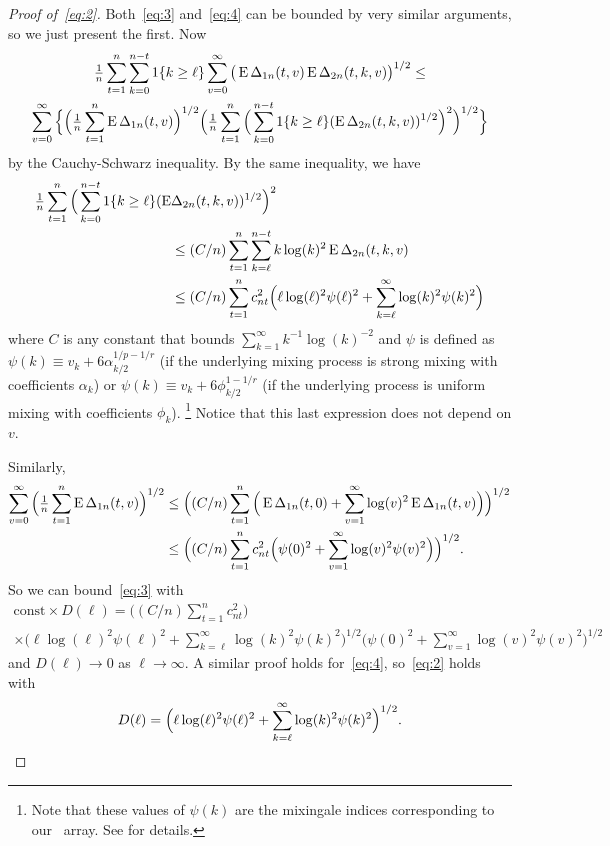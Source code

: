 \documentclass[11pt]{article}
\begin{document}
{\begin{proof}[Proof of~\eqref{eq:2}]
  Both~\eqref{eq:3} and~\eqref{eq:4} can be bounded by very similar
  arguments, so we just present the first. Now
  \begin{multline*}
    \tfrac{1}{n} \sum_{t=1}^n \sum_{k=0}^{n-t}  1\{k \geq \ell\}
    \sum_{v=0}^\infty \big(\operatorname{E} \Delta_{1n}(t,v) \operatorname{E} \Delta_{2n}(t,k,v)\big)^{1/2} \leq \\
    \sum_{v=0}^\infty \Big\{
    \Big(\tfrac{1}{n} \sum_{t=1}^n \operatorname{E} \Delta_{1n}(t, v) \Big)^{1/2}
    \Big(\tfrac{1}{n} \sum_{t=1}^n \Big(\sum_{k=0}^{n-t}
    1\{k \geq \ell\} (\operatorname{E} \Delta_{2n}(t,k,v))^{1/2} \Big)^2 \Big)^{1/2}
    \Big\}
  \end{multline*}
  by the Cauchy-Schwarz inequality.  By the same inequality, we have
  \begin{align*}
    \tfrac{1}{n} \sum_{t=1}^n \Big(\sum_{k=0}^{n-t}
    1\{k \geq \ell\} (\operatorname{E} & \Delta_{2n}(t,k,v))^{1/2} \Big)^2 \\
     & \leq (C/n) \sum_{t=1}^n
     \sum_{k=\ell}^{n-t} k \log(k)^2 \operatorname{E} \Delta_{2n}(t,k,v) \\
     & \leq (C/n) \sum_{t=1}^n c_{nt}^2 \Big(\ell \log(\ell)^2 \psi(\ell)^2
     + \sum_{k=\ell}^{\infty} \log(k)^2 \psi(k)^2 \Big)
  \end{align*}
  where $C$ is any constant that bounds $\sum_{k=1}^{\infty} k^{-1}
  \log(k)^{-2}$ and $\psi$ is defined as $\psi(k) \equiv v_k + 6 \alpha_{k/2}^{1/p -1/r}$ (if
  the underlying mixing process is strong mixing with coefficients
  $\alpha_k$) or $\psi(k) \equiv v_k + 6 \phi_{k/2}^{1 - 1/r}$ (if the
  underlying process is uniform mixing with coefficients $\phi_k$).%
\footnote{Note that these values of $\psi(k)$ are the mixingale
  indices corresponding to our \ned\ array. See \citet[Theorem 17.15]{Dav:94}
  for details.} %
  Notice that this last expression does not depend on $v$.

  Similarly,
  \begin{align*}
    \sum_{v=0}^{\infty}\Big(\tfrac{1}{n} \sum_{t=1}^n \operatorname{E} \Delta_{1n}(t,v) \Big)^{1/2}
    & \leq
     \Big((C/n) \sum_{t=1}^{n}\Big( \operatorname{E} \Delta_{1n}(t,0) + \sum_{v=1}^{\infty} \log(v)^2
     \operatorname{E} \Delta_{1n}(t,v)\Big) \Big)^{1/2} \\
     & \leq \Big((C/n) \sum_{t=1}^n c_{nt}^2
     \Big( \psi(0)^2 + \sum_{v=1}^{\infty} \log(v)^2 \psi(v)^2 \Big)\Big)^{1/2}.
  \end{align*}
  So we can bound~\eqref{eq:3} with
  \begin{multline*}
    \text{const} \times D(\ell) = \Big((C/n) \sum_{t=1}^{n} c_{nt}^2\Big) \\
    \times \Big(\ell \log(\ell)^2 \psi(\ell)^2
     + \sum_{k=\ell}^{\infty} \log(k)^2 \psi(k)^2 \Big)^{1/2}
     \Big( \psi(0)^2 + \sum_{v=1}^{\infty} \log(v)^2 \psi(v)^2 \Big)^{1/2}
  \end{multline*}
  and $D(\ell) \to 0$ as $\ell \to \infty$.
  A similar proof holds for~\eqref{eq:4}, so~\eqref{eq:2} holds with
  \begin{equation*}
    D(\ell) =
    \Big(\ell \log(\ell)^2 \psi(\ell)^2
    + \sum_{k=\ell}^{\infty} \log(k)^2 \psi(k)^2 \Big)^{1/2}. \qedhere
  \end{equation*}
\end{proof}
}
\end{document}
